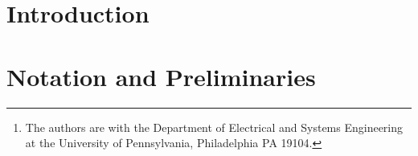 \documentclass[draftcls,onecolumn,12pt]{IEEEtran}
\theoremstyle{plain}
\theoremstyle{plain}
\begin{document}
\title{}
\author{%
\thanks{The authors are with the Department of Electrical and Systems Engineering
at the University of Pennsylvania, Philadelphia PA 19104.  %
}}
\maketitle

\begin{abstract}
\end{abstract}

\section{Introduction}

\section{Notation and Preliminaries}\label{sec:prelim}







\end{document}
